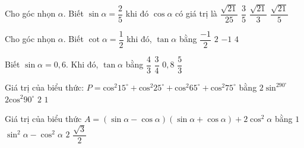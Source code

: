 \begin{ex}%
	Cho góc nhọn $\alpha$. Biết $\sin \alpha=\dfrac{2}{5}$ khi đó $\cos \alpha$ có giá trị là
	\choice
	{$\dfrac{\sqrt{21}}{25}$}
	{$\dfrac{3}{5}$}
	{$\dfrac{\sqrt{21}}{3}$}
	{\True $\dfrac{\sqrt{21}}{5}$}
\end{ex}
\begin{ex}%
	Cho góc nhọn $\alpha$. Biết $\cot \alpha=\dfrac{1}{2}$ khi đó, $\tan \alpha$ bằng
	\choice
	{$\dfrac{-1}{2}$}
	{\True $2$}
	{$-1$}
	{$4$}
\end{ex}
\begin{ex}%
	Biết $\sin \alpha=0,6$. Khi đó, $\tan \alpha$ bằng
	\choice
	{$\dfrac{4}{3}$}
	{\True $\dfrac{3}{4}$}
	{$0,8$}
	{$\dfrac{5}{3}$}
\end{ex}
\begin{ex}%
	Giá trị của biểu thức: $P=\mathrm{co}\mathrm{s^2}15^\circ+\mathrm{co}\mathrm{s^2}25^\circ+\mathrm{co}\mathrm{s^2}65^\circ+\mathrm{co}\mathrm{s^2}75^\circ$ bằng
	\choice
	{$2\sin^290^\circ$}
	{$2\mathrm{co}\mathrm{s^2}90^\circ$}
	{\True $2$}
	{$1$}
\end{ex}
\begin{ex}%
	Giá trị của biểu thức $A=(\sin \alpha-\cos \alpha)(\sin \alpha+\cos \alpha)+2\cos^2\alpha$ bằng
	\choice
	{\True $1$}
	{$\sin^2\alpha-\cos^2\alpha$}
	{$2$}
	{$\dfrac{\sqrt{3}}{2}$}
\end{ex}
